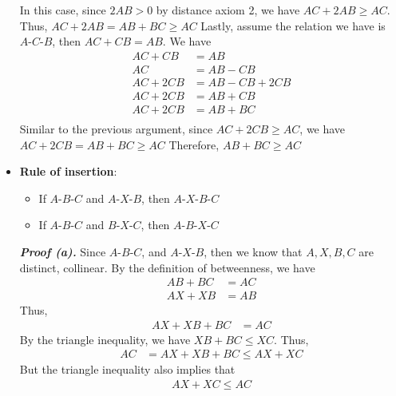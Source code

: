 \documentclass{report}
\begin{document}
\begin{itemize}
            In this case, since $2AB > 0$ by distance axiom 2, we have $AC + 2AB \geq AC$. Thus, $AC + 2AB = AB + BC \geq AC $ 
            \bigbreak \noindent 
            Lastly, assume the relation we have is $ A\text{-}C\text{-}B$, then $AC + CB = AB$. We have
            \begin{align*}
                AC + CB &= AB \\
                AC &= AB - CB \\
                AC + 2CB &= AB - CB + 2CB \\
                AC + 2CB &= AB + CB \\
                AC + 2CB &= AB + BC \\
            \end{align*}
            Similar to the previous argument, since $AC + 2CB \geq AC$, we have $AC + 2CB = AB + BC \geq AC $
            \bigbreak \noindent 
            Therefore, $ AB + BC \geq AC$ \endpf
        \item \textbf{Rule of insertion}: 
            \begin{itemize}
                \item If $ A\text{-}B\text{-}C$ and $ A\text{-}X\text{-}B$, then $ A\text{-}X\text{-}B\text{-}C $
                \item If $ A\text{-}B\text{-}C$ and $ B\text{-}X\text{-}C$, then $ A\text{-}B\text{-}X\text{-}C $
            \end{itemize}
            \bigbreak \noindent 
            \textbf{\textit{Proof (a).}} Since $ A\text{-}B\text{-}C$, and $ A\text{-}X\text{-}B$, then we know that $A,X,B,C$ are distinct, collinear. 
            \bigbreak \noindent 
            By the definition of betweenness, we have
            \begin{align*}
                AB  + BC &= AC \\
                AX + XB &= AB
            \end{align*}
            Thus,
            \begin{align*}
                AX + XB + BC &= AC
            \end{align*}
            By the triangle inequality, we have $XB + BC \leq XC$. Thus,
            \begin{align*}
                AC & =AX + XB +  BC \leq AX + XC
            \end{align*}
            But the triangle inequality also implies that 
            \begin{align*}
                AX + XC \leq AC

\end{align*}
\end{itemize}
\end{document}
